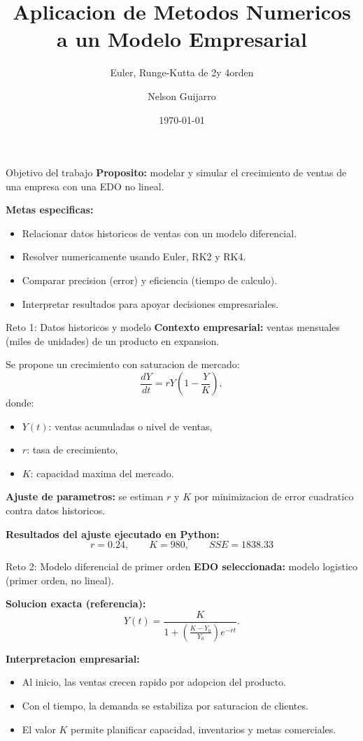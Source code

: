 \documentclass[aspectratio=169]{beamer}
\title{Aplicacion de Metodos Numericos a un Modelo Empresarial}
\subtitle{Euler, Runge-Kutta de 2\textdegree y 4\textdegree orden}
\author{Nelson Guijarro}
\institute{Diplomado TICS}
\date{\today}
\begin{document}
\begin{frame}
  \titlepage
\end{frame}

\begin{frame}{Objetivo del trabajo}
\textbf{Proposito:} modelar y simular el crecimiento de ventas de una empresa con una EDO no lineal.

\vspace{0.3cm}
\textbf{Metas especificas:}
\begin{itemize}
  \item Relacionar datos historicos de ventas con un modelo diferencial.
  \item Resolver numericamente usando Euler, RK2 y RK4.
  \item Comparar precision (error) y eficiencia (tiempo de calculo).
  \item Interpretar resultados para apoyar decisiones empresariales.
\end{itemize}
\end{frame}

\begin{frame}{Reto 1: Datos historicos y modelo}
\textbf{Contexto empresarial:} ventas mensuales (miles de unidades) de un producto en expansion.

\vspace{0.2cm}
Se propone un crecimiento con saturacion de mercado:
\[
\frac{dY}{dt} = rY\left(1 - \frac{Y}{K}\right),
\]
donde:
\begin{itemize}
  \item $Y(t)$: ventas acumuladas o nivel de ventas,
  \item $r$: tasa de crecimiento,
  \item $K$: capacidad maxima del mercado.
\end{itemize}

\textbf{Ajuste de parametros:} se estiman $r$ y $K$ por minimizacion de error cuadratico contra datos historicos.

\vspace{0.2cm}
\textbf{Resultados del ajuste ejecutado en Python:}
\[
r = 0.24, \qquad K = 980, \qquad SSE = 1838.33
\]
\end{frame}

\begin{frame}{Reto 2: Modelo diferencial de primer orden}
\textbf{EDO seleccionada:} modelo logistico (primer orden, no lineal).

\vspace{0.3cm}
\textbf{Solucion exacta (referencia):}
\[
Y(t)=\frac{K}{1+\left(\frac{K-Y_0}{Y_0}\right)e^{-rt}}.
\]

\textbf{Interpretacion empresarial:}
\begin{itemize}
  \item Al inicio, las ventas crecen rapido por adopcion del producto.
  \item Con el tiempo, la demanda se estabiliza por saturacion de clientes.
  \item El valor $K$ permite planificar capacidad, inventarios y metas comerciales.
\end{itemize}
\end{frame}
\end{document}
